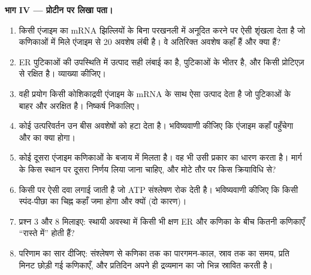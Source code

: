 \begin{problem}
\medskip
\noindent\textbf{भाग IV --- प्रोटीन पर लिखा पता।}
\begin{enumerate}[resume]
  \item किसी एंजाइम का mRNA झिल्लियों के बिना परखनली में अनूदित करने पर
        ऐसी शृंखला देता है जो कणिकाओं में मिले एंजाइम से \qty{20}{}
        अवशेष लंबी है। वे अतिरिक्त अवशेष कहाँ हैं और क्या हैं?
  \item ER पुटिकाओं की उपस्थिति में उत्पाद सही लंबाई का है, पुटिकाओं के
        भीतर है, और किसी प्रोटिएज़ से रक्षित है। व्याख्या कीजिए।
  \item वही प्रयोग किसी कोशिकाद्रवी एंजाइम के mRNA के साथ ऐसा उत्पाद
        देता है जो पुटिकाओं के बाहर और अरक्षित है। निष्कर्ष निकालिए।
  \item कोई उत्परिवर्तन उन बीस अवशेषों को हटा देता है। भविष्यवाणी
        कीजिए कि एंजाइम कहाँ पहुँचेगा और  का क्या होगा।
  \item कोई दूसरा एंजाइम कणिकाओं के बजाय  में मिलता है। वह भी
        उसी प्रकार का  धारण करता है। मार्ग के किस स्थान पर
        दूसरा निर्णय लिया जाना चाहिए, और मोटे तौर पर किस क्रियाविधि से?
  \item किसी  पर ऐसी दवा लगाई जाती है जो ATP संश्लेषण रोक देती
        है। भविष्यवाणी कीजिए कि किसी स्पंद-पीछा का चिह्न कहाँ जमा होगा
        और क्यों (दो कारण)।
  \item प्रश्न 3 और 8 मिलाइए: स्थायी अवस्था में किसी भी क्षण ER और
        कणिका के बीच कितनी कणिकाएँ ``रास्ते में'' होती हैं?
  \item परिणाम का सार दीजिए: संश्लेषण से कणिका तक का पारगमन-काल, स्राव
        तक का समय, प्रति मिनट छोड़ी गई कणिकाएँ, और  प्रतिदिन अपने
        ही द्रव्यमान का जो भिन्न स्रावित करती है।
\end{enumerate}
\end{problem}
